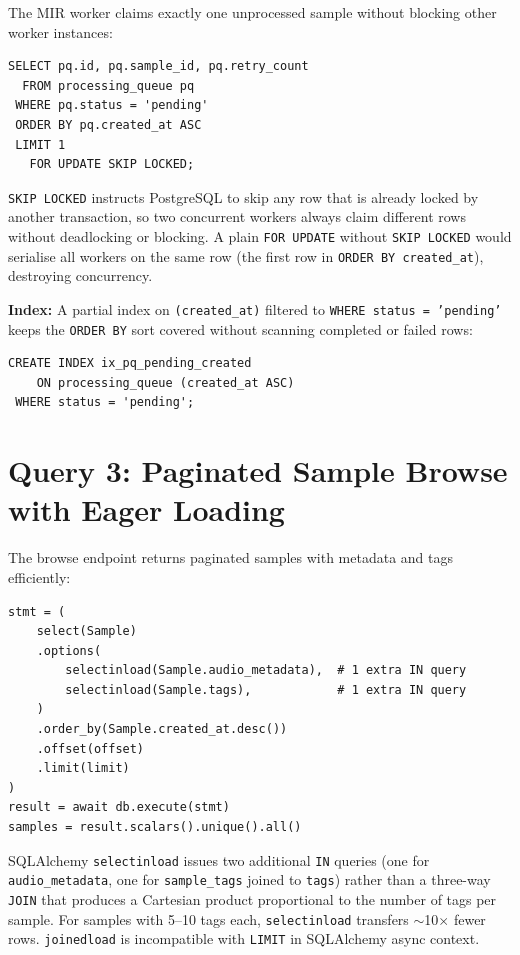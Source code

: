 \documentclass[12pt,letterpaper]{report}
\begin{document}
The MIR worker claims exactly one unprocessed sample without blocking other worker instances:

\begin{lstlisting}[style=sqlstyle,
  caption={Atomic, deadlock-free queue claim using SELECT FOR UPDATE SKIP LOCKED},
  label={lst:queue-claim}]
SELECT pq.id, pq.sample_id, pq.retry_count
  FROM processing_queue pq
 WHERE pq.status = 'pending'
 ORDER BY pq.created_at ASC
 LIMIT 1
   FOR UPDATE SKIP LOCKED;
\end{lstlisting}

\texttt{SKIP LOCKED} instructs PostgreSQL to skip any row that is already locked by another transaction, so two concurrent workers always claim different rows without deadlocking or blocking. A plain \texttt{FOR UPDATE} without \texttt{SKIP LOCKED} would serialise all workers on the same row (the first row in \texttt{ORDER BY created\_at}), destroying concurrency.

\textbf{Index:} A partial index on \texttt{(created\_at)} filtered to \texttt{WHERE status = 'pending'} keeps the \texttt{ORDER BY} sort covered without scanning completed or failed rows:

\begin{lstlisting}[style=sqlstyle, caption={Partial index to speed up pending-queue scans}]
CREATE INDEX ix_pq_pending_created
    ON processing_queue (created_at ASC)
 WHERE status = 'pending';
\end{lstlisting}

\section{Query 3: Paginated Sample Browse with Eager Loading}

The browse endpoint returns paginated samples with metadata and tags efficiently:

\begin{lstlisting}[style=pythonstyle,
  caption={Paginated sample listing --- selectinload avoids a cartesian JOIN},
  label={lst:browse}]
stmt = (
    select(Sample)
    .options(
        selectinload(Sample.audio_metadata),  # 1 extra IN query
        selectinload(Sample.tags),            # 1 extra IN query
    )
    .order_by(Sample.created_at.desc())
    .offset(offset)
    .limit(limit)
)
result = await db.execute(stmt)
samples = result.scalars().unique().all()
\end{lstlisting}

SQLAlchemy \texttt{selectinload} issues two additional \texttt{IN} queries (one for \texttt{audio\_metadata}, one for \texttt{sample\_tags} joined to \texttt{tags}) rather than a three-way \texttt{JOIN} that produces a Cartesian product proportional to the number of tags per sample. For samples with 5--10 tags each, \texttt{selectinload} transfers $\sim$10$\times$ fewer rows. \texttt{joinedload} is incompatible with \texttt{LIMIT} in SQLAlchemy async context.
\end{document}
